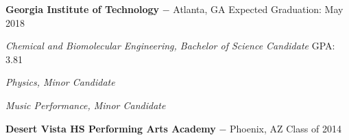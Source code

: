 
\textbf{Georgia Institute of Technology} $-$ Atlanta, GA
\hfill
Expected Graduation: May 2018

\textit{Chemical and Biomolecular Engineering, Bachelor of Science Candidate}
\hfill
GPA: 3.81

\textit{Physics, Minor Candidate}

\textit{Music Performance, Minor Candidate}

\textbf{Desert Vista HS Performing Arts Academy} $-$ Phoenix, AZ
\hfill
Class of 2014

